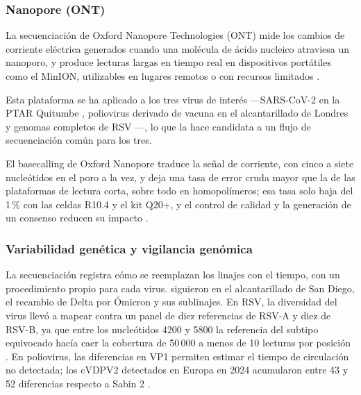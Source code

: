\subsubsection{Nanopore (ONT)}

La secuenciación de Oxford Nanopore Technologies (ONT) mide los cambios de corriente eléctrica generados cuando una molécula de ácido nucleico atraviesa un nanoporo, y produce lecturas largas en tiempo real en dispositivos portátiles como el MinION, utilizables en lugares remotos o con recursos limitados \cite{Dash_2024}.

Esta plataforma se ha aplicado a los tres virus de interés —SARS-CoV-2 en la PTAR Quitumbe \cite{MejiaCalle_2024}, poliovirus derivado de vacuna en el alcantarillado de Londres \cite{Klapsa_2022} y genomas completos de RSV \cite{Le_2025}—, lo que la hace candidata a un flujo de secuenciación común para los tres.

El basecalling de Oxford Nanopore traduce la señal de corriente, con cinco a siete nucleótidos en el poro a la vez, y deja una tasa de error cruda mayor que la de las plataformas de lectura corta, sobre todo en homopolímeros; esa tasa solo baja del 1\,\% con las celdas R10.4 y el kit Q20+, y el control de calidad y la generación de un consenso reducen su impacto \cite{Dash_2024}.


\subsubsection{Variabilidad genética y vigilancia genómica}

La secuenciación registra cómo se reemplazan los linajes con el tiempo, con un procedimiento propio para cada virus.  siguieron en el alcantarillado de San Diego, el recambio de Delta por Ómicron y sus sublinajes. En RSV, la diversidad del virus llevó a mapear contra un panel de diez referencias de RSV-A y diez de RSV-B, ya que entre los nucleótidos 4200 y 5800 la referencia del subtipo equivocado hacía caer la cobertura de 50\,000 a menos de 10 lecturas por posición \cite{Le_2025}. En poliovirus, las diferencias en VP1 permiten estimar el tiempo de circulación no detectada; los cVDPV2 detectados en Europa en 2024 acumularon entre 43 y 52 diferencias respecto a Sabin 2 \cite{Bottcher_2025}.

